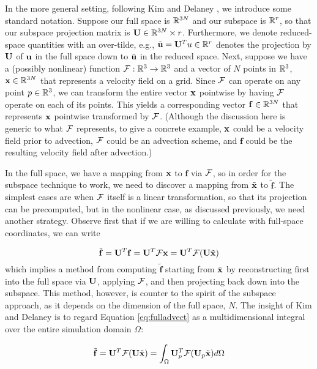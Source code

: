 In the more general setting, following Kim and Delaney \cite{Kim2013}, we introduce some standard notation. Suppose our full space is $\mathbb{R}^{3N}$ and our subspace is $\mathbb{R}^{r}$, so that our subspace 
projection matrix is $\mathbf{U} \in \mathbb{R}^{3N} \times r$. Furthermore, we denote reduced-space quantities with an over-tilde, e.g., $\tilde{\mathbf{u}} = \mathbf{U}^T u \in \mathbb{R}^{r}$ denotes the projection by $\mathbf{U}$ of $\mathbf{u}$ in the full space 
down to $\tilde{\mathbf{u}}$ in the reduced space. Next, suppose we have a (possibly nonlinear) function $\mathcal{F} : \mathbb{R}^3 \rightarrow \mathbb{R}^3$ and a vector of $N$ points in $\mathbb{R}^3$, $\mathbf{x} \in \mathbb{R}^{3N}$ that represents
a velocity field on a grid. Since $\mathcal{F}$ can operate on any point $p \in \mathbb{R}^3$, we can transform the entire vector $\mathbf{x}$ pointwise by having $\mathcal{F}$ operate on each of its points. This
yields a corresponding vector $\mathbf{f} \in \mathbb{R}^{3N}$ that represents $\mathbf{x}$ pointwise transformed by $\mathcal{F}$. (Although the discussion here is generic to what $\mathcal{F}$ represents, to give a concrete
example, $\mathbf{x}$ could be a velocity field prior to advection, $\mathcal{F}$ could be an advection scheme, and $\mathbf{f}$ could be the resulting velocity field after advection.)

In the full space, we have a mapping from $\mathbf{x}$ to $\mathbf{f}$ via $\mathcal{F}$, so in order for the subspace technique to work, we need to discover a mapping from $\tilde{\mathbf{x}}$ to $\tilde{\mathbf{f}}$. 
The simplest cases are when $\mathcal{F}$ itself is a linear transformation, so that its projection can be precomputed, but in the nonlinear case, as discussed previously, we need another strategy.
Observe first that if we are willing to calculate with full-space coordinates, we can write

\begin{equation}
\label{eq:fulladvect}
\tilde{\mathbf{f}} = \mathbf{U}^T \mathbf{f} = \mathbf{U}^T \mathcal{F} \mathbf{x} = \mathbf{U}^T \mathcal{F}(\mathbf{U}\tilde{\mathbf{x}})
\end{equation}
which implies a method from computing $\tilde{\mathbf{f}}$ starting from $\tilde{\mathbf{x}}$ by reconstructing first into the full space via $\mathbf{U}$, applying $\mathcal{F}$, and then projecting back
down into the subspace. This method, however, is counter to the spirit of the subspace approach, as it depends on the dimension of the full space, $N$. The insight of Kim and Delaney is to regard
Equation \ref{eq:fulladvect} as a multidimensional integral over the entire simulation domain $\Omega$:

\begin{equation}
\label{eq:integral}
\tilde{\mathbf{f}} = \mathbf{U}^T \mathcal{F}(\mathbf{U}\tilde{\mathbf{x}}) = \int_{\Omega} \mathbf{U}_p^T \mathcal{F}(\mathbf{U}_p \tilde{\mathbf{x}})d\Omega
\end{equation}



